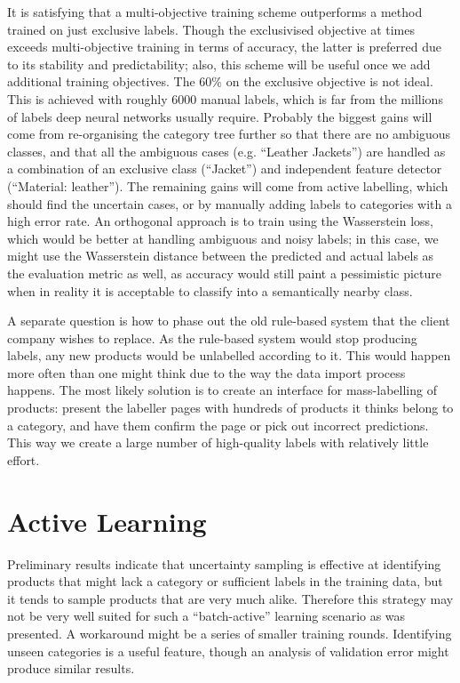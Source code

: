It is satisfying that a multi-objective training scheme outperforms a method trained on just exclusive labels.
Though the exclusivised objective at times exceeds multi-objective training in terms of accuracy, the latter is preferred due to its stability and predictability; also, this scheme will be useful once we add additional training objectives.
The 60\% on the exclusive objective is not ideal.
This is achieved with roughly 6000 manual labels, which is far from the millions of labels deep neural networks usually require.
Probably the biggest gains will come from re-organising the category tree further so that there are no ambiguous classes, and that all the ambiguous cases (e.g. ``Leather Jackets'') are handled as a combination of an exclusive class (``Jacket'') and independent feature detector (``Material: leather'').
The remaining gains will come from active labelling, which should find the uncertain cases, or by manually adding labels to categories with a high error rate.
An orthogonal approach is to train using the Wasserstein loss, which would be better at handling ambiguous and noisy labels; in this case, we might use the Wasserstein distance between the predicted and actual labels as the evaluation metric as well, as accuracy would still paint a pessimistic picture when in reality it is acceptable to classify into a semantically nearby class.

A separate question is how to phase out the old rule-based system that the client company wishes to replace.
As the rule-based system would stop producing labels, any new products would be unlabelled according to it.
This would happen more often than one might think due to the way the data import process happens.
The most likely solution is to create an interface for mass-labelling of products: present the labeller pages with hundreds of products it thinks belong to a category, and have them confirm the page or pick out incorrect predictions.
This way we create a large number of high-quality labels with relatively little effort.

\section{Active Learning}

Preliminary results indicate that uncertainty sampling is effective at identifying products that might lack a category or sufficient labels in the training data, but it tends to sample products that are very much alike.
Therefore this strategy may not be very well suited for such a ``batch-active'' learning scenario as was presented.
A workaround might be a series of smaller training rounds.
Identifying unseen categories is a useful feature, though an analysis of validation error might produce similar results.
